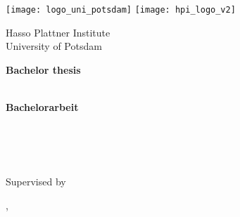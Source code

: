 \begin{titlepage}

\centering

\texttt{[image: logo\_uni\_potsdam]}
\hspace{2.5cm}
\texttt{[image: hpi\_logo\_v2]}
\vspace*{0.75cm}

\Large 
Hasso Plattner Institute\\
University of Potsdam

\vspace{1.5cm}

\Large
\textbf{Bachelor thesis}\\[0.5\baselineskip]
\LARGE
\textbf{\docTitle}\\[0.5\baselineskip]

\vspace{1.5cm}

\Large
\textbf{Bachelorarbeit}\\[0.5\baselineskip]
\LARGE
\textbf{\docTitleDE}\\[0.5\baselineskip]

\vspace{1.5cm}

\Large
\docAuthor\\
{\normalsize \docAuthorMail}\\

\vfill

\large
Supervised by \docSupervisited\\
\docChair

\vspace{1cm}
\textsf{\docCity{}, \docDate}\\ %
\end{titlepage}
